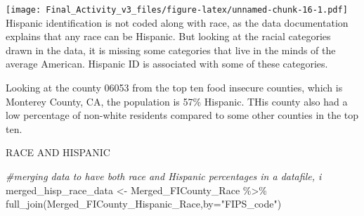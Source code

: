 \documentclass[
]{article}
\newenvironment{Shaded}{\begin{snugshade}}{\end{snugshade}}
\newcommand{\AttributeTok}[1]{\textcolor[rgb]{0.77,0.63,0.00}{#1}}
\newcommand{\CommentTok}[1]{\textcolor[rgb]{0.56,0.35,0.01}{\textit{#1}}}
\newcommand{\FunctionTok}[1]{\textcolor[rgb]{0.00,0.00,0.00}{#1}}
\newcommand{\NormalTok}[1]{#1}
\newcommand{\OtherTok}[1]{\textcolor[rgb]{0.56,0.35,0.01}{#1}}
\newcommand{\SpecialCharTok}[1]{\textcolor[rgb]{0.00,0.00,0.00}{#1}}
\newcommand{\StringTok}[1]{\textcolor[rgb]{0.31,0.60,0.02}{#1}}
\begin{document}
\texttt{[image: Final\_Activity\_v3\_files/figure-latex/unnamed-chunk-16-1.pdf]}
Hispanic identification is not coded along with race, as the data
documentation explains that any race can be Hispanic. But looking at the
racial categories drawn in the data, it is missing some categories that
live in the minds of the average American. Hispanic ID is associated
with some of these categories.

Looking at the county 06053 from the top ten food insecure counties,
which is Monterey County, CA, the population is 57\% Hispanic. THis
county also had a low percentage of non-white residents compared to some
other counties in the top ten.

RACE AND HISPANIC

\begin{Shaded}
\begin{Highlighting}[]
\CommentTok{\#merging data to have both race and Hispanic percentages in a datafile, i}
\NormalTok{merged\_hisp\_race\_data }\OtherTok{\textless{}{-}}\NormalTok{ Merged\_FICounty\_Race }\SpecialCharTok{\%\textgreater{}\%} \FunctionTok{full\_join}\NormalTok{(Merged\_FICounty\_Hispanic\_Race,}\AttributeTok{by=}\StringTok{"FIPS\_code"}\NormalTok{)}


\end{Highlighting}
\end{Shaded}
\end{document}
